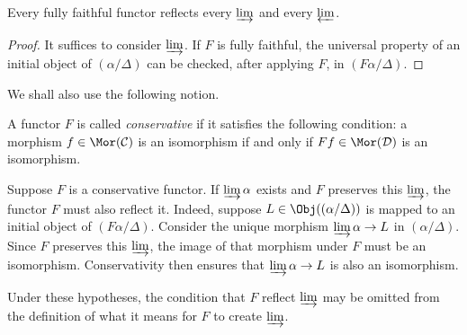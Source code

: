 \begin{proposition}\label{prop:ff-reflect}
	Every fully faithful functor reflects every $\varinjlim$ and every
	$\varprojlim$.
\end{proposition}
\begin{proof}
	It suffices to consider $\varinjlim$. If $F$ is fully faithful, the
	universal property of an initial object of $(\alpha/\Delta)$ can be checked,
	after applying $F$, in $(F\alpha/\Delta)$.
\end{proof}

We shall also use the following notion.

\begin{definition}\label{def:conservative}
	A functor $F$ is called \emph{conservative} if it satisfies the following
	condition: a morphism $f \in \Mor(\mathcal{C})$ is an isomorphism if and
	only if $Ff \in \Mor(\mathcal{D})$ is an isomorphism.
\end{definition}

\begin{remark}\label{rem:conservative-reflect}
	Suppose $F$ is a conservative functor. If
	$\varinjlim \alpha$ exists and $F$ preserves this $\varinjlim$, the functor
	$F$ must also reflect it. Indeed, suppose
	$L \in \Obj((\alpha/\Delta))$ is mapped to an initial object of
	$(F\alpha/\Delta)$. Consider the unique morphism
	$\varinjlim \alpha \to L$ in $(\alpha/\Delta)$. Since $F$ preserves this
	$\varinjlim$, the image of that morphism under $F$ must be an isomorphism.
	Conservativity then ensures that $\varinjlim \alpha \to L$ is also an
	isomorphism.

	Under these hypotheses, the condition that $F$ reflect $\varinjlim$ may be
	omitted from the definition of what it means for $F$ to create
	$\varinjlim$.
\end{remark}

